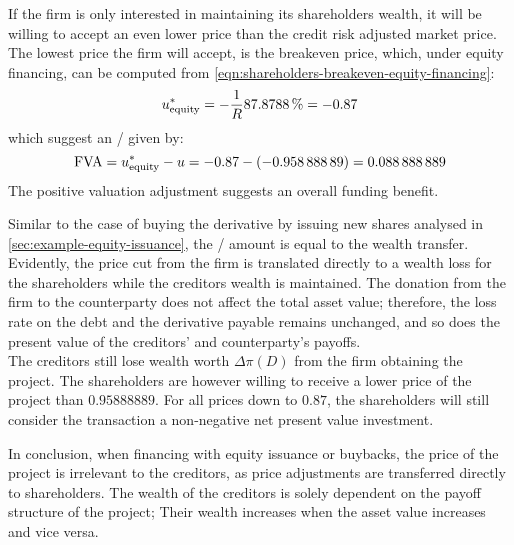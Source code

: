 \documentclass[../main.tex]{subfiles}
\begin{document}
            If the firm is only interested in maintaining its shareholders wealth,
            it will be willing to accept an even lower price than the credit risk adjusted market price.
            The lowest price the firm will accept, is the breakeven price,
            which, under equity financing, can be computed from 
            \cref{eqn:shareholders-breakeven-equity-financing}:
            \begin{equation}
                u_{\text{equity}}^{\ast} =
                - \discountfactor
                \pct{0.878788}
                = \num{-0.87}
            \end{equation}
            which suggest an \FVA/ given by:
            \begin{equation}
                \FVA/ =
                u_{\text{equity}}^{\ast} - u =
                \num{-0.87} - \left(\num{-0.95888889}\right) =
                \num{0.088888889}
            \end{equation}
            The positive valuation adjustment suggests an overall funding benefit.
            
            Similar to the case of buying the derivative by issuing new shares analysed in \cref{sec:example-equity-issuance},
            the \FVA/ amount is equal to the wealth transfer.
            Evidently, the price cut from the firm is translated directly to a wealth loss
            for the shareholders while the creditors wealth is maintained. 
            The donation from the firm to the counterparty does not affect the total asset value;
            therefore, the loss rate on the debt and the derivative payable remains unchanged,
            and so does the present value of the creditors' and counterparty's payoffs.
            \\
            The creditors still lose wealth worth $\Delta \pi(D)$ from the firm obtaining the project.
            The shareholders are however willing to receive a lower price of the project than $\num{0.95888889}$.
            For all prices down to $\num{0.87}$,
            the shareholders will still consider the transaction a non-negative net present value investment.

            In conclusion, when financing with equity issuance or buybacks,
            the price of the project is irrelevant to the creditors,
            as price adjustments are transferred directly to shareholders.
            The wealth of the creditors is solely dependent on the payoff structure of the project;
            Their wealth increases when the asset value increases and vice versa.
\end{document}

